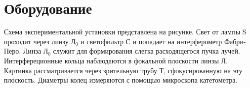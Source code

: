 \section{Оборудование}
\begin{figure}[ht!]
\end{figure}

Схема экспериментальной установки представлена на рисунке. Свет от лампы S проходит через линзу $\text{Л}_{0}$ и светофильтр С и попадает на интерферометр Фабри-Перо. Линза $\text{Л}_{0}$ служит для формирования слегка расходящегося пучка лучей. Интерфереционные кольца наблюдаются в фокальной плоскости линзы Л. Картинка рассматривается через зрительную трубу Т, сфокусированную на эту плоскость. Диаметры колец измеряются с помощью микроскопа катетометра.
